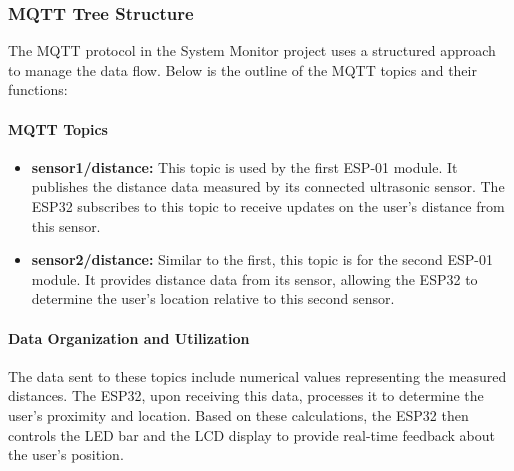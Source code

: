 \documentclass{article}
\begin{document}
\subsubsection{MQTT Tree Structure}
The MQTT protocol in the System Monitor project uses a structured approach to manage the data flow. Below is the outline of the MQTT topics and their functions:

\paragraph{MQTT Topics}
\begin{itemize}
    \item \textbf{sensor1/distance:} This topic is used by the first ESP-01 module. It publishes the distance data measured by its connected ultrasonic sensor. The ESP32 subscribes to this topic to receive updates on the user's distance from this sensor.
    \item \textbf{sensor2/distance:} Similar to the first, this topic is for the second ESP-01 module. It provides distance data from its sensor, allowing the ESP32 to determine the user's location relative to this second sensor.
\end{itemize}

\paragraph{Data Organization and Utilization}
The data sent to these topics include numerical values representing the measured distances. The ESP32, upon receiving this data, processes it to determine the user's proximity and location. Based on these calculations, the ESP32 then controls the LED bar and the LCD display to provide real-time feedback about the user's position.
\end{document}
